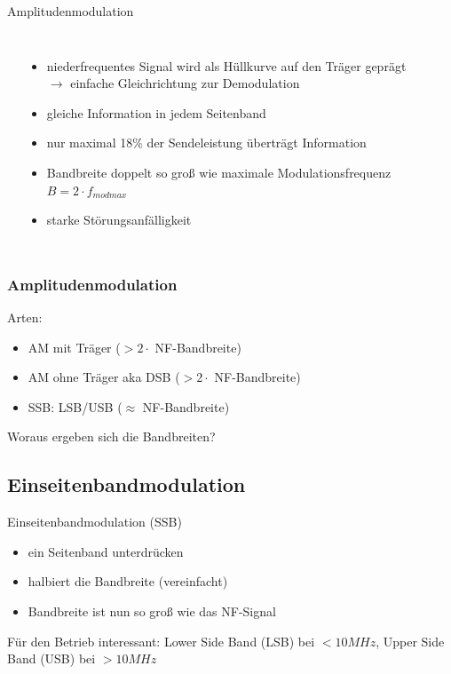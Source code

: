 \begin{frame}{Amplitudenmodulation}
\begin{columns}[c]
    {\tiny \hyperlink{refs}{\cite{wm}}}
    \begin{itemize}
      \item niederfrequentes Signal wird als Hüllkurve auf den Träger geprägt
        \\ $\rightarrow$ einfache Gleichrichtung zur Demodulation
      \item gleiche Information in jedem Seitenband
      \item nur maximal 18\% der Sendeleistung überträgt Information
      \item Bandbreite doppelt so groß wie maximale Modulationsfrequenz $B = 2 \cdot f_{mod max}$
      \item starke Störungsanfälligkeit
    \end{itemize}
  \end{columns}
\end{frame}

\begin{frame}
  \frametitle{Amplitudenmodulation}

  Arten:

  \begin{itemize}
    \item AM mit Träger ($> 2 \cdot$ NF-Bandbreite)
    \item AM ohne Träger aka DSB ($> 2 \cdot$ NF-Bandbreite)
    \item SSB: LSB/USB ($\approx$ NF-Bandbreite)
  \end{itemize}


  \vspace{2em} Woraus ergeben sich die Bandbreiten?

\end{frame}

\subsection[SSB]{Einseitenbandmodulation}

\begin{frame}{Einseitenbandmodulation (SSB)}

  \begin{itemize}
    \item ein Seitenband unterdrücken
    \item halbiert die Bandbreite (vereinfacht)
    \item Bandbreite ist nun so groß wie das NF-Signal
  \end{itemize}

  \bigskip Für den Betrieb interessant: Lower Side Band (LSB) bei $<10MHz$, Upper Side Band (USB) bei $>10MHz$

\end{frame}

